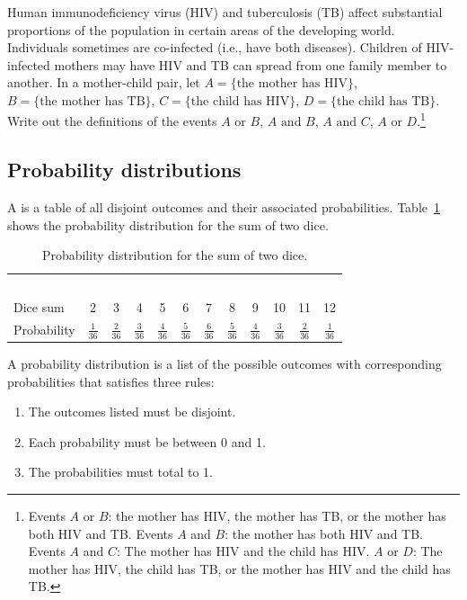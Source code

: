 \begin{exercise}
{Human immunodeficiency virus (HIV) and tuberculosis (TB) affect substantial proportions of the population in certain areas of the developing world. Individuals sometimes are co-infected (i.e., have both diseases). Children of HIV-infected mothers may have HIV and TB can spread from one family member to another.  In a mother-child pair, let $A = \{\text{the mother has HIV} \}$,  $B = \{\textrm{the mother has TB} \}$, $C = \{\text{the child has HIV} \}$,  $D = \{\text{the child has TB} \}$.  Write out the definitions of the events $A \text{ or } B$, $A \text{ and } B$, $A \text{ and } C$, $A \text{ or } D$.}\footnote{Events $A$ or $B$: the mother has HIV, the mother has TB, or the mother has both HIV and TB. Events $A$ and $B$: the mother has both HIV and TB. Events $A$ and $C$: The mother has HIV and the child has HIV. $A$ or $D$: The mother has HIV, the child has TB, or the mother has HIV and the child has TB.}

\end{exercise}

\subsection{Probability distributions}

A  is a table of all disjoint outcomes and their associated probabilities. Table~\ref{diceProb} shows the probability distribution for the sum of two dice. 

\begin{table}[h] \small
\centering
\begin{tabular}{l ccc ccc ccc cc}
  \hline
  \ \vspace{-3mm} \\
Dice sum\vspace{0.3mm} & 2 & 3 & 4 & 5 & 6 & 7 & 8 & 9 & 10 & 11 & 12  \\
Probability & $\frac{1}{36}$ & $\frac{2}{36}$ & $\frac{3}{36}$ & $\frac{4}{36}$ & $\frac{5}{36}$ & $\frac{6}{36}$ & $\frac{5}{36}$ & $\frac{4}{36}$ & $\frac{3}{36}$ & $\frac{2}{36}$ & $\frac{1}{36}$\vspace{1mm} \\
   \hline
\end{tabular}
\caption{Probability distribution for the sum of two dice.}
\label{diceProb}
\end{table}

\begin{termBox}{
A probability distribution is a list of the possible outcomes with corresponding probabilities that satisfies three rules: \vspace{-2mm}
\begin{enumerate}
\setlength{\itemsep}{0mm}
\item The outcomes listed must be disjoint.
\item Each probability must be between 0 and 1.
\item The probabilities must total to 1. \vspace{1mm}
\end{enumerate}}
\end{termBox}


